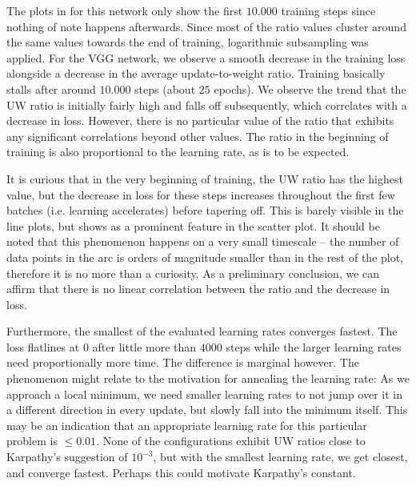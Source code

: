 The plots in for this network only show the first $10.000$ training steps since
nothing of note happens afterwards. Since most of the ratio values cluster
around the same values towards the end of training, logarithmic subsampling was
applied.  For the VGG network, we observe a smooth decrease in the training loss
alongside a decrease in the average update-to-weight ratio. Training basically
stalls after around $10.000$ steps (about $25$ epochs).  We observe the trend
that the UW ratio is initially fairly high and falls off subsequently, which
correlates with a decrease in loss. However, there is no particular value of the
ratio that exhibits any significant correlations beyond other values. The
ratio in the beginning of training is also proportional to the learning rate, as
is to be expected.

It is curious that in the very beginning of training, the UW ratio has the
highest value, but the decrease in loss for these steps increases throughout the
first few batches (i.e. learning accelerates) before tapering off. This is
barely visible in the line plots, but shows as a prominent feature in the
scatter plot. It should be noted that this phenomenon happens on a very small
timescale -- the number of data points in the arc is orders of magnitude smaller
than in the rest of the plot, therefore it is no more than a curiosity. As a
preliminary conclusion, we can affirm that there is no linear correlation
between the ratio and the decrease in loss.

Furthermore, the smallest of the evaluated learning rates converges fastest.
The loss flatlines at $0$ after little more than $4000$ steps while the larger
learning rates need proportionally more time. The difference is marginal
however. The phenomenon might relate to the motivation for annealing the
learning rate: As we approach a local minimum, we need smaller learning rates to
not jump over it in a different direction in every update, but slowly fall into
the minimum itself. This may be an indication that an appropriate learning rate
for this particular problem is $\le 0.01$. None of the configurations exhibit UW
ratios close to Karpathy's suggestion of $10^{-3}$, but with the smallest
learning rate, we get closest, and converge fastest. Perhaps this could motivate
Karpathy's constant.

